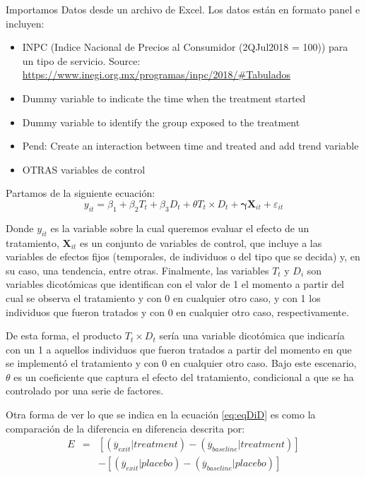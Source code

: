 \documentclass[
]{book}
\begin{document}
Importamos Datos desde un archivo de Excel. Los datos están en formato panel e incluyen:

\begin{itemize}
    \item INPC (Indice Nacional de Precios al Consumidor (2QJul2018 = 100)) para un tipo de servicio. Source: \url{https://www.inegi.org.mx/programas/inpc/2018/#Tabulados}

    \item Dummy variable to indicate the time when the treatment started

    \item Dummy variable to identify the group exposed to the treatment

    \item Pend: Create an interaction between time and treated and add trend variable

    \item OTRAS variables de control
\end{itemize}

Partamos de la siguiente ecuación:
\begin{equation}
    y_{it} = \beta_1 + \beta_2 T_t + \beta_3 D_t + \theta T_t \times D_t + \boldsymbol{\gamma} \mathbf{X}_{it} + \varepsilon_{it}
    \label{eq:eqDiD}
\end{equation}

Donde \(y_{it}\) es la variable sobre la cual queremos evaluar el efecto de un tratamiento, \(\mathbf{X}_{it}\) es un conjunto de variables de control, que incluye a las variables de efectos fijos (temporales, de individuos o del tipo que se decida) y, en su caso, una tendencia, entre otras. Finalmente, las variables \(T_t\) y \(D_i\) son variables dicotómicas que identifican con el valor de 1 el momento a partir del cual se observa el tratamiento y con 0 en cualquier otro caso, y con 1 los individuos que fueron tratados y con 0 en cualquier otro caso, respectivamente.

De esta forma, el producto \(T_t \times D_t\) sería una variable dicotómica que indicaría con un 1 a aquellos individuos que fueron tratados a partir del momento en que se implementó el tratamiento y con 0 en cualquier otro caso. Bajo este escenario, \(\theta\) es un coeficiente que captura el efecto del tratamiento, condicional a que se ha controlado por una serie de factores.

Otra forma de ver lo que se indica en la ecuación \eqref{eq:eqDiD} es como la comparación de la diferencia en diferencia descrita por:
\begin{eqnarray}
    E & = & [ (\overline{y}_{exit} | treatment) - (\overline{y}_{baseline} | treatment) ] \nonumber \\  
    &  & - [ (\overline{y}_{exit} | placebo) - (\overline{y}_{baseline} | placebo) ]
    \label{eq:eqDiDE}
\end{eqnarray}
\end{document}
